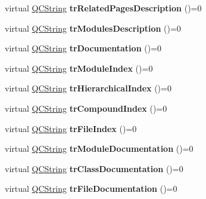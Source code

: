 \begin{DoxyCompactItemize}
virtual \mbox{\hyperlink{class_q_c_string}{Q\+C\+String}} {\bfseries tr\+Related\+Pages\+Description} ()=0
\item 
\mbox{\label{class_translator_a36c9337d60e94df29e4c7769910e0272}} 
virtual \mbox{\hyperlink{class_q_c_string}{Q\+C\+String}} {\bfseries tr\+Modules\+Description} ()=0
\item 
\mbox{\label{class_translator_a49c727268a64ce6b2989070c475d14be}} 
virtual \mbox{\hyperlink{class_q_c_string}{Q\+C\+String}} {\bfseries tr\+Documentation} ()=0
\item 
\mbox{\label{class_translator_a1528b760ac55c716b31a5bfeb0fce464}} 
virtual \mbox{\hyperlink{class_q_c_string}{Q\+C\+String}} {\bfseries tr\+Module\+Index} ()=0
\item 
\mbox{\label{class_translator_a2bd618847b3b5a486bc777240d791c5f}} 
virtual \mbox{\hyperlink{class_q_c_string}{Q\+C\+String}} {\bfseries tr\+Hierarchical\+Index} ()=0
\item 
\mbox{\label{class_translator_a7040654c74fbc401fab833fa581ab04d}} 
virtual \mbox{\hyperlink{class_q_c_string}{Q\+C\+String}} {\bfseries tr\+Compound\+Index} ()=0
\item 
\mbox{\label{class_translator_a211fb54600da7fd1c98dc7b45e045f6b}} 
virtual \mbox{\hyperlink{class_q_c_string}{Q\+C\+String}} {\bfseries tr\+File\+Index} ()=0
\item 
\mbox{\label{class_translator_a8af0b797724f6454dd670173ecdea786}} 
virtual \mbox{\hyperlink{class_q_c_string}{Q\+C\+String}} {\bfseries tr\+Module\+Documentation} ()=0
\item 
\mbox{\label{class_translator_a7f2ce6d3f52323d11e2ec9021c1daff1}} 
virtual \mbox{\hyperlink{class_q_c_string}{Q\+C\+String}} {\bfseries tr\+Class\+Documentation} ()=0
\item 
\mbox{\label{class_translator_a60511677ac6d642d9ad9226e6a225550}} 
virtual \mbox{\hyperlink{class_q_c_string}{Q\+C\+String}} {\bfseries tr\+File\+Documentation} ()=0
\item 

\end{DoxyCompactItemize}
